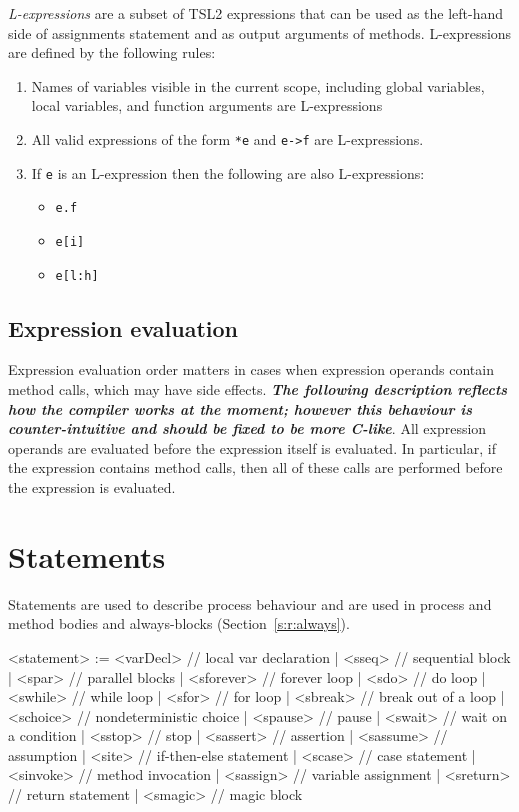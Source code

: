 \documentclass{report}
\newcommand{\src}[1]{\texttt{#1}}
\newcommand{\tsl}{TSL2 }
\newcommand{\comment}[1]{{\textit{\textbf{#1}}}}
\begin{document}
\emph{L-expressions} are a subset of \tsl expressions that can be 
used as the left-hand side of assignments statement and as output 
arguments of methods.  L-expressions are defined by the following 
rules:
\begin{enumerate}
    \item Names of variables visible in the current scope, 
        including global variables, local variables, and function 
        arguments are L-expressions
    \item All valid expressions of the form \src{*e} and 
        \src{e->f} are L-expressions.
    \item If \src{e} is an L-expression then the following are 
        also L-expressions:
        \begin{itemize}
            \item \src{e.f}
            \item \src{e[i]}
            \item \src{e[l:h]}
        \end{itemize}
\end{enumerate}

\subsection{Expression evaluation}

Expression evaluation order matters in cases when expression 
operands contain method calls, which may have side effects.  
\comment{The following description reflects how the compiler works 
at the moment; however this behaviour is counter-intuitive and 
should be fixed to be more C-like}.  All expression operands are 
evaluated before the expression itself is evaluated.  In 
particular, if the expression contains method calls, then all of 
these calls are performed before the expression is evaluated.

\section{Statements}

Statements are used to describe process behaviour and are used in 
process and method bodies and always-blocks 
(Section~\ref{s:r:always}).

\begin{bnflisting}{}
<statement> := <varDecl>  // local var declaration
             | <sseq>     // sequential block
             | <spar>     // parallel blocks
             | <sforever> // forever loop
             | <sdo>      // do loop
             | <swhile>   // while loop
             | <sfor>     // for loop
             | <sbreak>   // break out of a loop
             | <schoice>  // nondeterministic choice
             | <spause>   // pause
             | <swait>    // wait on a condition
             | <sstop>    // stop
             | <sassert>  // assertion
             | <sassume>  // assumption
             | <site>     // if-then-else statement
             | <scase>    // case statement
             | <sinvoke>  // method invocation
             | <sassign>  // variable assignment
             | <sreturn>  // return statement
             | <smagic>   // magic block
\end{bnflisting}
\end{document}
